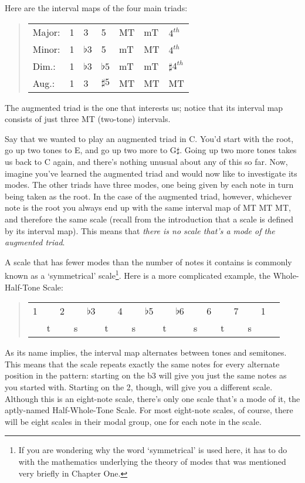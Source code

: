 \documentclass[english]{./gbook}
\begin{document}
\begin{large}
Here are the interval maps of the four main triads:
\begin{quote}
\begin{tabular}{lllllll}
Major:	&1	&3	&5		&MT	&mT	&$4^{th}$\\
Minor:	&1	&$\flat 3$	&5		&mT	&MT	&$4^{th}$\\
Dim.:	&1	&$\flat 3$&$\flat 5$		&mT	&mT	&$\sharp 4^{th}$\\
Aug.:	&1	&3	&$\sharp 5$		&MT	&MT	&MT
\end{tabular}
\end{quote}
The augmented triad is the one that interests us; notice that its interval map consists of just three MT (two-tone) intervals. 

Say that we wanted to play an augmented triad in C. You'd start with the root, go up two tones to E, and go up two more to G$\sharp$. Going up two more tones takes us back to C again, and there's nothing unusual about any of this so far. Now, imagine you've learned the augmented triad and would now like to investigate its modes. The other triads have three modes, one being given by each note in turn being taken as the root. In the case of the augmented triad, however, whichever note is the root you always end up with the same interval map of MT MT MT, and therefore the same scale (recall from the introduction that a scale is defined by its interval map). This means that \emph{there is no scale that's a mode of the augmented triad}.

A scale that has fewer modes than the number of notes it contains is commonly known as a `symmetrical' scale\footnote{If you are wondering why the word `symmetrical' is used here, it has to do with the mathematics underlying the theory of modes that was mentioned very briefly in Chapter One.}. Here is a more complicated example, the Whole-Half-Tone Scale:
\begin{quote}
\begin{tabular}{llllllllllllllllll}
1	&&2	&&$\flat$3	&&4	&&$\flat$5	&&$\flat$6	&&6	&&7	&&1 \\
   &t     &&  s          &&t         &&s         &&t              &&s        &&t    &&s  &  
\end{tabular}
\end{quote}
As its name implies, the interval map alternates between tones and semitones. This means that the scale repeats exactly the same notes for every alternate position in the pattern: starting on the b3 will give you just the same notes as you started with. Starting on the 2, though, will give you a different scale. Although this is an eight-note scale, there's only one scale that's a mode of it, the aptly-named Half-Whole-Tone Scale. For most eight-note scales, of course, there will be eight scales in their modal group, one for each note in the scale.


\end{large}
\end{document}
